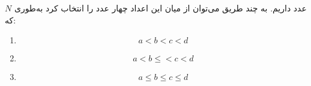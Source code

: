 \EXERCISE
$N$
عدد داریم. به چند طریق می‌توان از میان این اعداد چهار عدد را انتخاب کرد به‌طوری که:
\begin{enumerate}
\item
$$a < b < c < d$$
\item
$$a < b \leq < c < d$$
\item
$$a \leq b \leq c \leq d$$
\end{enumerate}
